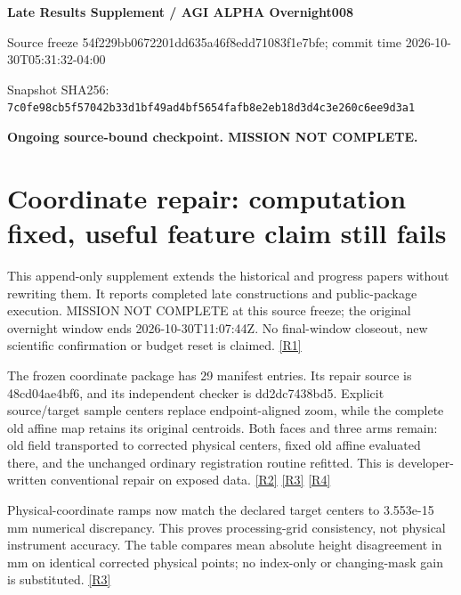 \documentclass[10pt,letterpaper]{article}
\begin{document}
{\Large\bfseries Late Results Supplement / AGI ALPHA Overnight008}\par
\footnotesize Source freeze 54f229bb0672201dd635a46f8edd71083f1e7bfe; commit time 2026-10-30T05:31:32-04:00\par
Snapshot SHA256: \texttt{7c0fe98cb5f57042b33d1bf49ad4bf5654fafb8e2eb18d3d4c3e260c6ee9d3a1}\par\normalsize
\textbf{Ongoing source-bound checkpoint. MISSION NOT COMPLETE.}\par
\section*{Coordinate repair: computation fixed, useful feature claim still fails}
This append-only supplement extends the historical and progress papers without rewriting them. It reports completed late constructions and public-package execution. MISSION NOT COMPLETE at this source freeze; the original overnight window ends 2026-10-30T11:07:44Z. No final-window closeout, new scientific confirmation or budget reset is claimed. \href{https://github.com/MontrealAI/AGI-Alpha-Invention-Flywheel-Lab/blob/54f229bb0672201dd635a46f8edd71083f1e7bfe/campaign/overnight-008/ALLOCATION.json}{[R1]}\par
The frozen coordinate package has 29 manifest entries. Its repair source is 48cd04ae4bf6, and its independent checker is dd2dc7438bd5. Explicit source/target sample centers replace endpoint-aligned zoom, while the complete old affine map retains its original centroids. Both faces and three arms remain: old field transported to corrected physical centers, fixed old affine evaluated there, and the unchanged ordinary registration routine refitted. This is developer-written conventional repair on exposed data. \href{https://github.com/MontrealAI/AGI-Alpha-Invention-Flywheel-Lab/blob/54f229bb0672201dd635a46f8edd71083f1e7bfe/research/nasa008/coordinate-r2/MANIFEST.json}{[R2]} \href{https://github.com/MontrealAI/AGI-Alpha-Invention-Flywheel-Lab/blob/54f229bb0672201dd635a46f8edd71083f1e7bfe/research/nasa008/coordinate-r2/bound/artifacts/RESULT.json}{[R3]} \href{https://github.com/MontrealAI/AGI-Alpha-Invention-Flywheel-Lab/blob/54f229bb0672201dd635a46f8edd71083f1e7bfe/research/nasa008/coordinate-r2/INDEPENDENT_REPAIR_REVIEW.json}{[R4]}\par
Physical-coordinate ramps now match the declared target centers to 3.553e-15 mm numerical discrepancy. This proves processing-grid consistency, not physical instrument accuracy. The table compares mean absolute height disagreement in mm on identical corrected physical points; no index-only or changing-mask gain is substituted. \href{https://github.com/MontrealAI/AGI-Alpha-Invention-Flywheel-Lab/blob/54f229bb0672201dd635a46f8edd71083f1e7bfe/research/nasa008/coordinate-r2/bound/artifacts/RESULT.json}{[R3]}\par
\end{document}
